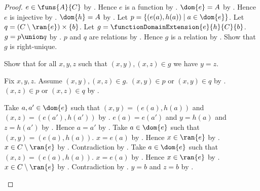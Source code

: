 \begin{proof}
    $e\in\funs{A}{C}$ by .
    Hence $e$ is a function by .
    $\dom{e}=A$ by .
    Hence $e$ is injective by .
    $\dom{h}=A$ by .
    Let $p=\{(e(a),h(a))\mid a\in\dom{e}\}$.
    Let $q=(C\setminus\ran{e})\times\{b\}$.
    Let $g=\functionDomainExtension{e}{h}{C}{b}$.
    $g=p\union q$ by .
    $p$ and $q$ are relations by .
    Hence $g$ is a relation by .
    Show that $g$ is right-unique.
    \begin{subproof}
        Show that for all $x,y,z$ such that $(x,y),(x,z)\in g$
            we have $y=z$.
        \begin{subproof}
            Fix $x,y,z$.
            Assume $(x,y),(x,z)\in g$.
            $(x,y)\in p$ or $(x,y)\in q$ by .
            $(x,z)\in p$ or $(x,z)\in q$ by .
            \begin{byCase}
                    Take $a,a'\in\dom{e}$ such that
                        $(x,y)=(e(a),h(a))$ and
                        $(x,z)=(e(a'),h(a'))$ by \auto.
                    $e(a)=e(a')$ and $y=h(a)$ and $z=h(a')$
                        by .
                    Hence $a=a'$ by .
                    Take $a\in\dom{e}$ such that
                        $(x,y)=(e(a),h(a))$.
                    $x=e(a)$ by .
                    Hence $x\in\ran{e}$ by .
                    $x\in C\setminus\ran{e}$
                        by .
                    Contradiction by .
                    Take $a\in\dom{e}$ such that
                        $(x,z)=(e(a),h(a))$.
                    $x=e(a)$ by .
                    Hence $x\in\ran{e}$ by .
                    $x\in C\setminus\ran{e}$
                        by .
                    Contradiction by .
                    $y=b$ and $z=b$
                        by .
            \end{byCase}
        \end{subproof}

\end{subproof}
\end{proof}
